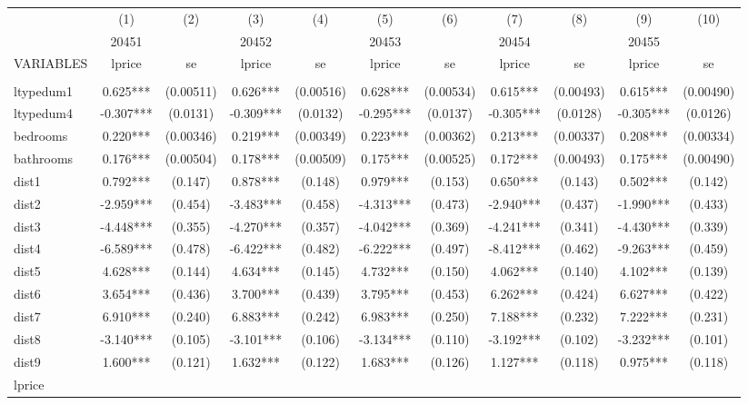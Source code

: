 \documentclass[]{article}
\begin{document}
\begin{tabular}{lcccccccccc} \hline
 & (1) & (2) & (3) & (4) & (5) & (6) & (7) & (8) & (9) & (10) \\
 & 20451 &  & 20452 &  & 20453 &  & 20454 &  & 20455 &  \\
VARIABLES & lprice & se & lprice & se & lprice & se & lprice & se & lprice & se \\ \hline
 &  &  &  &  &  &  &  &  &  &  \\
ltypedum1 & 0.625*** & (0.00511) & 0.626*** & (0.00516) & 0.628*** & (0.00534) & 0.615*** & (0.00493) & 0.615*** & (0.00490) \\
ltypedum4 & -0.307*** & (0.0131) & -0.309*** & (0.0132) & -0.295*** & (0.0137) & -0.305*** & (0.0128) & -0.305*** & (0.0126) \\
bedrooms & 0.220*** & (0.00346) & 0.219*** & (0.00349) & 0.223*** & (0.00362) & 0.213*** & (0.00337) & 0.208*** & (0.00334) \\
bathrooms & 0.176*** & (0.00504) & 0.178*** & (0.00509) & 0.175*** & (0.00525) & 0.172*** & (0.00493) & 0.175*** & (0.00490) \\
dist1 & 0.792*** & (0.147) & 0.878*** & (0.148) & 0.979*** & (0.153) & 0.650*** & (0.143) & 0.502*** & (0.142) \\
dist2 & -2.959*** & (0.454) & -3.483*** & (0.458) & -4.313*** & (0.473) & -2.940*** & (0.437) & -1.990*** & (0.433) \\
dist3 & -4.448*** & (0.355) & -4.270*** & (0.357) & -4.042*** & (0.369) & -4.241*** & (0.341) & -4.430*** & (0.339) \\
dist4 & -6.589*** & (0.478) & -6.422*** & (0.482) & -6.222*** & (0.497) & -8.412*** & (0.462) & -9.263*** & (0.459) \\
dist5 & 4.628*** & (0.144) & 4.634*** & (0.145) & 4.732*** & (0.150) & 4.062*** & (0.140) & 4.102*** & (0.139) \\
dist6 & 3.654*** & (0.436) & 3.700*** & (0.439) & 3.795*** & (0.453) & 6.262*** & (0.424) & 6.627*** & (0.422) \\
dist7 & 6.910*** & (0.240) & 6.883*** & (0.242) & 6.983*** & (0.250) & 7.188*** & (0.232) & 7.222*** & (0.231) \\
dist8 & -3.140*** & (0.105) & -3.101*** & (0.106) & -3.134*** & (0.110) & -3.192*** & (0.102) & -3.232*** & (0.101) \\
dist9 & 1.600*** & (0.121) & 1.632*** & (0.122) & 1.683*** & (0.126) & 1.127*** & (0.118) & 0.975*** & (0.118) \\
lprice &  &  &  &  &  &  &  &  &  &  \\

\end{tabular}
\end{document}
